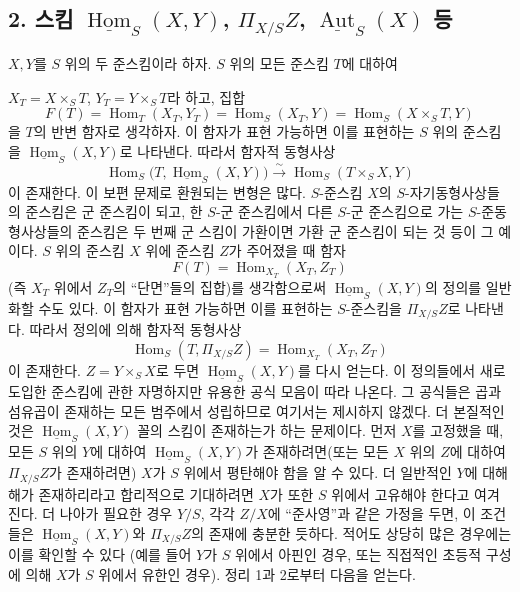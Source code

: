 \documentclass[11pt,twoside,openany]{book}
\numberwithin{equation}{section}
\newcommand{\sourceunit}{front}
\newcommand{\src}[1]{%
  \phantomsection\hypertarget{src:\sourceunit:#1}{}%
  \marginpar{\raggedleft\footnotesize\sffamily #1}%
}
\theoremstyle{plain}
\theoremstyle{definition}
\theoremstyle{remark}
\begin{document}
\subsection*{2. 스킴 $\underline{\operatorname{Hom}}_S(X,Y)$,
$\Pi_{X/S}Z$, $\underline{\operatorname{Aut}}_S(X)$ 등}

$X,Y$를 $S$ 위의 두 준스킴이라 하자. $S$ 위의 모든 준스킴 $T$에 대하여

\src{381}
$X_T=X\times_ST$, $Y_T=Y\times_ST$라 하고, 집합
\[
  F(T)=\operatorname{Hom}_T(X_T,Y_T)
      =\operatorname{Hom}_S(X_T,Y)
      =\operatorname{Hom}_S(X\times_ST,Y)
\]
을 $T$의 반변 함자로 생각하자. 이 함자가 표현 가능하면 이를 표현하는
$S$ 위의 준스킴을 $\underline{\operatorname{Hom}}_S(X,Y)$로 나타낸다.
따라서 함자적 동형사상
\[
  \operatorname{Hom}_S
  \bigl(T,\underline{\operatorname{Hom}}_S(X,Y)\bigr)
  \xrightarrow{\sim}
  \operatorname{Hom}_S(T\times_SX,Y)
\]
이 존재한다. 이 보편 문제로 환원되는 변형은 많다. $S$-준스킴 $X$의
$S$-자기동형사상들의 준스킴은 군 준스킴이 되고, 한 $S$-군 준스킴에서
다른 $S$-군 준스킴으로 가는 $S$-준동형사상들의 준스킴은 두 번째 군
스킴이 가환이면 가환 군 준스킴이 되는 것 등이 그 예이다.
$S$ 위의 준스킴 $X$ 위에 준스킴 $Z$가 주어졌을 때 함자
\[
  F(T)=\operatorname{Hom}_{X_T}(X_T,Z_T)
\]
(즉 $X_T$ 위에서 $Z_T$의 ``단면''들의 집합)를 생각함으로써
$\underline{\operatorname{Hom}}_S(X,Y)$의 정의를 일반화할 수도 있다.
이 함자가 표현 가능하면 이를 표현하는 $S$-준스킴을 $\Pi_{X/S}Z$로
나타낸다. 따라서 정의에 의해 함자적 동형사상
\[
  \operatorname{Hom}_S(T,\Pi_{X/S}Z)
  =\operatorname{Hom}_{X_T}(X_T,Z_T)
\]
이 존재한다. $Z=Y\times_SX$로 두면
$\underline{\operatorname{Hom}}_S(X,Y)$를 다시 얻는다. 이 정의들에서
새로 도입한 준스킴에 관한 자명하지만 유용한 공식 모음이 따라 나온다.
그 공식들은 곱과 섬유곱이 존재하는 모든 범주에서 성립하므로 여기서는
제시하지 않겠다. 더 본질적인 것은
$\underline{\operatorname{Hom}}_S(X,Y)$ 꼴의 스킴이 존재하는가 하는
문제이다. 먼저 $X$를 고정했을 때, 모든 $S$ 위의 $Y$에 대하여
$\underline{\operatorname{Hom}}_S(X,Y)$가 존재하려면(또는 모든 $X$
위의 $Z$에 대하여 $\Pi_{X/S}Z$가 존재하려면) $X$가 $S$ 위에서 평탄해야
함을 알 수 있다. 더 일반적인 $Y$에 대해 해가 존재하리라고 합리적으로
기대하려면 $X$가 또한 $S$ 위에서 고유해야 한다고 여겨진다. 더 나아가
필요한 경우 $Y/S$, 각각 $Z/X$에 ``준사영''과 같은 가정을 두면, 이
조건들은 $\underline{\operatorname{Hom}}_S(X,Y)$와 $\Pi_{X/S}Z$의
존재에 충분한 듯하다. 적어도 상당히 많은 경우에는 이를 확인할 수 있다
(예를 들어 $Y$가 $S$ 위에서 아핀인 경우, 또는 직접적인 초등적 구성에
의해 $X$가 $S$ 위에서 유한인 경우). 정리 1과 2로부터 다음을 얻는다.
\end{document}
